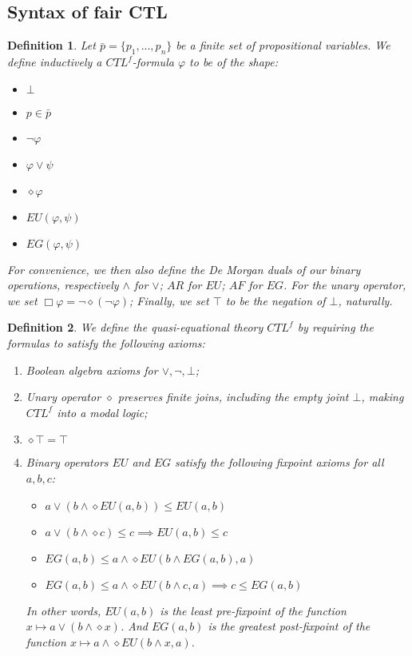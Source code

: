 \documentclass[11pt]{article}
\newtheorem{definition}{Definition}[section]
\begin{document}
\subsection*{Syntax of fair CTL}\label{subsec:syntax_CTLf}
\begin{definition}\label{CTLf_formulas}
Let $\bar{p}= \{p_1,...,p_n \}$ be a finite set of propositional variables. We define inductively a \emph{$CTL^{f}$-formula} $\varphi$ to be of the shape:
\begin{itemize}
    \setlength\itemsep{0em}
    \item[-] $\bot$
    \item[-] $p \in \bar{p}$
    \item[-] $\neg \varphi$
    \item[-] $\varphi \vee \psi$
    \item[-] $\diamond \varphi$
    \item[-] $EU(\varphi,\psi)$
    \item[-] $EG(\varphi,\psi)$ 
\end{itemize}
For convenience, we then also define the De Morgan duals of our binary operations, respectively $\wedge$ for $\vee$; $AR$ for $EU$; $AF$ for $EG$. For the unary operator, we set $\Box \varphi = \neg \diamond(\neg \varphi)$; Finally, we set $\top$ to be the negation of $\bot$, naturally.\end{definition}

\begin{definition}\label{quasi_eq_CTLf}
We define the \emph{quasi-equational theory $CTL^{f}$} by requiring the formulas to satisfy the following axioms:
\begin{enumerate}
    \setlength\itemsep{0em}
    \item Boolean algebra axioms for $\vee,\neg,\bot$;
    \item Unary operator $\diamond$ preserves finite joins, including the empty joint $\bot$, making $CTL^f$ into a modal logic;
    \item $\diamond \top = \top$
    \item Binary operators $EU$ and $EG$ satisfy the following \emph{fixpoint axioms} for all $a,b,c$:
    \begin{itemize}
        \item[-] $a \vee (b \wedge \diamond EU(a,b)) \leq EU(a,b)$
        \item[-] $a \vee (b \wedge \diamond c) \leq c \implies EU(a,b) \leq c$ 
        \item[-] $EG(a,b)\leq a\wedge \diamond EU(b\wedge EG(a,b),a)$
        \item[-] $EG(a,b)\leq a\wedge \diamond EU(b\wedge c,a) \implies c \leq EG(a,b)$
    \end{itemize}
    In other words, $EU(a,b)$ is the \emph{least pre-fixpoint} of the function $x \mapsto a \vee (b \wedge \diamond x)$.
    And $EG(a,b)$ is the \emph{greatest post-fixpoint} of the function $x \mapsto a\wedge \diamond EU(b\wedge x,a)$.
\end{enumerate}
\end{definition}
\end{document}
